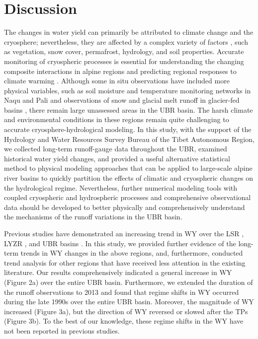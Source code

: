 \documentclass[hess, manuscript]{copernicus}
\begin{document}
\section{Discussion}
The changes in water yield can primarily be attributed to climate change and the cryosphere; nevertheless, they are affected by a complex variety of factors \citep{liu2020variability,harris2017geocryology}, such as vegetation, snow cover, permafrost, hydrology, and soil properties. 
Accurate monitoring of cryospheric processes is essential for understanding the changing composite interactions in alpine regions and predicting regional responses to climate warming \citep{yao2019recent}. Although some in situ observations have included more physical variables, such as soil moisture and temperature monitoring networks in Naqu and Pali \citep{chen2017evaluation}
and observations of snow and glacial melt runoff in glacier-fed basins \citep{zhang2016modeling}, there remain large unassessed areas in the UBR basin.
The harsh climate and environmental conditions in these regions remain quite challenging to accurate cryosphere-hydrological modeling. In this study, with the support of the Hydrology and Water Resources Survey Bureau of the Tibet Autonomous Region, we collected long-term runoff-gauge data throughout the UBR, examined historical water yield changes, and provided a useful alternative statistical method to physical modeling approaches that can be applied to large-scale alpine river basins to quickly partition the effects of climatic and cryospheric changes on the hydrological regime. Nevertheless, further numerical modeling tools with coupled cryospheric and hydrospheric processes and comprehensive observational data \citep[e.g.,]{wang2017development} should be developed to better physically and comprehensively understand the mechanisms of the runoff variations in the UBR basin.

Previous studies have demonstrated an increasing trend in WY over the LSR \citep{linhess2020}, LYZR \citep{zhangech2011}, and UBR basins \citep{li2021vegetation}. In this study, we provided further evidence of the long-term trends in WY changes in the above regions, and, furthermore, conducted trend analysis for other regions that have received less attention in the existing literature. Our results comprehensively indicated a general increase in WY (Figure 2a) over the entire UBR basin. Furthermore, we extended the duration of the runoff observations to 2013 and found that regime shifts in WY occurred during the late 1990s over the entire UBR basin. Moreover, the magnitude of WY increased (Figure 3a), but the direction of WY reversed or slowed after the TPs (Figure 3b). To the best of our knowledge, these regime shifts in the WY have not been reported in previous studies.
\end{document}
